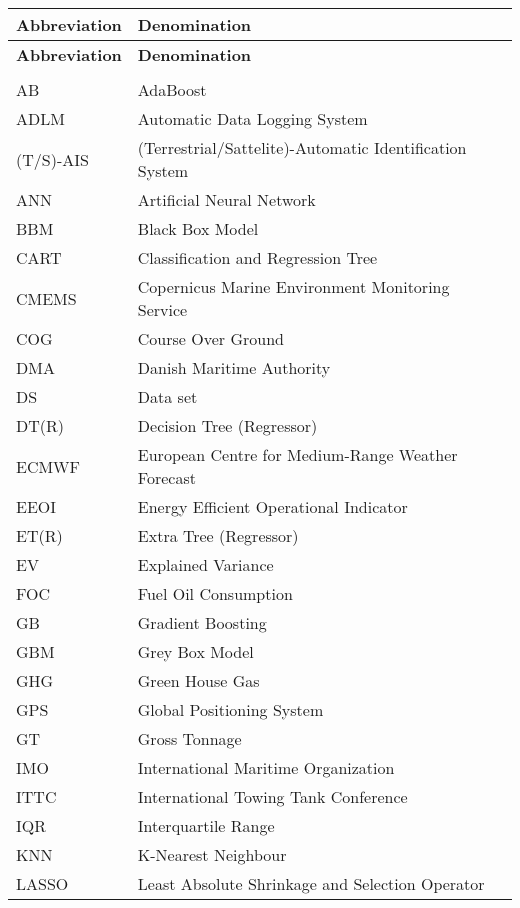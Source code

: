 \begin{longtable}[l]{>{}l<{}l}
  \textbf{Abbreviation} & \textbf{Denomination} \\[0.5ex] \hline%
  \endfirsthead%
  \textbf{Abbreviation} & \textbf{Denomination} \\[0.5ex] \hline%
  \endhead%
\renewcommand{\arraystretch}{1.4}\label{abbreviations}
&\\%
AB          & AdaBoost\\%
ADLM        & Automatic Data Logging System\\%
(T/S)-AIS   & (Terrestrial/Sattelite)-Automatic Identification System\\%
ANN         & Artificial Neural Network\\%
BBM         & Black Box Model\\%
CART        & Classification and Regression Tree\\%
CMEMS       & Copernicus Marine Environment Monitoring Service \\%
COG         & Course Over Ground \\%
DMA         & Danish Maritime Authority \\%
DS          & Data set \\%
DT(R)       & Decision Tree (Regressor)\\%
ECMWF       & European Centre for Medium-Range Weather Forecast\\%
EEOI        & Energy Efficient Operational Indicator\\%
ET(R)       & Extra Tree (Regressor)\\%
EV          & Explained Variance \\%
FOC         & Fuel Oil Consumption\\%
GB          & Gradient Boosting\\%
GBM         & Grey Box Model \\%
GHG         & Green House Gas \\%
GPS         & Global Positioning System\\%
GT          & Gross Tonnage\\%
IMO         & International Maritime Organization\\%
ITTC        & International Towing Tank Conference \\%
IQR         & Interquartile Range \\%
KNN         & K-Nearest Neighbour\\%
LASSO       & Least Absolute Shrinkage and Selection Operator\\%

\end{longtable}
